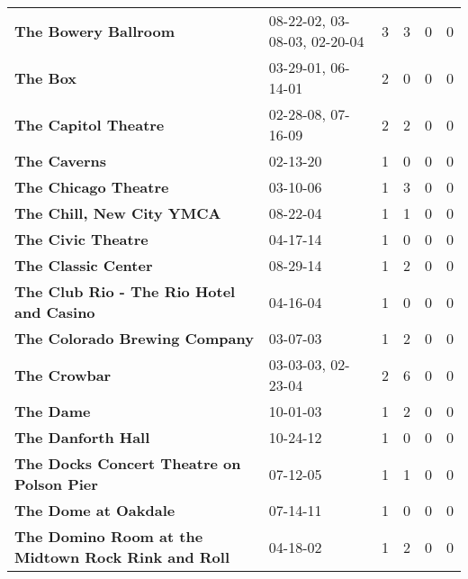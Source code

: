 \begin{supertabular}{llllll}
                                         \textbf{The Bowery Ballroom} &  08-22-02, 03-08-03, 02-20-04 &  3 &   3 &  0 &  0 \\
                                                     \textbf{The Box} &            03-29-01, 06-14-01 &  2 &   0 &  0 &  0 \\
                                         \textbf{The Capitol Theatre} &            02-28-08, 07-16-09 &  2 &   2 &  0 &  0 \\
                                                 \textbf{The Caverns} &                      02-13-20 &  1 &   0 &  0 &  0 \\
                                         \textbf{The Chicago Theatre} &                      03-10-06 &  1 &   3 &  0 &  0 \\
                                    \textbf{The Chill, New City YMCA} &                      08-22-04 &  1 &   1 &  0 &  0 \\
                                           \textbf{The Civic Theatre} &                      04-17-14 &  1 &   0 &  0 &  0 \\
                                          \textbf{The Classic Center} &                      08-29-14 &  1 &   2 &  0 &  0 \\
                     \textbf{The Club Rio - The Rio Hotel and Casino} &                      04-16-04 &  1 &   0 &  0 &  0 \\
                                \textbf{The Colorado Brewing Company} &                      03-07-03 &  1 &   2 &  0 &  0 \\
                                                 \textbf{The Crowbar} &            03-03-03, 02-23-04 &  2 &   6 &  0 &  0 \\
                                                    \textbf{The Dame} &                      10-01-03 &  1 &   2 &  0 &  0 \\
                                           \textbf{The Danforth Hall} &                      10-24-12 &  1 &   0 &  0 &  0 \\
                    \textbf{The Docks Concert Theatre on Polson Pier} &                      07-12-05 &  1 &   1 &  0 &  0 \\
                                         \textbf{The Dome at Oakdale} &                      07-14-11 &  1 &   0 &  0 &  0 \\
           \textbf{The Domino Room at the Midtown Rock Rink and Roll} &                      04-18-02 &  1 &   2 &  0 &  0 \\

\end{supertabular}
